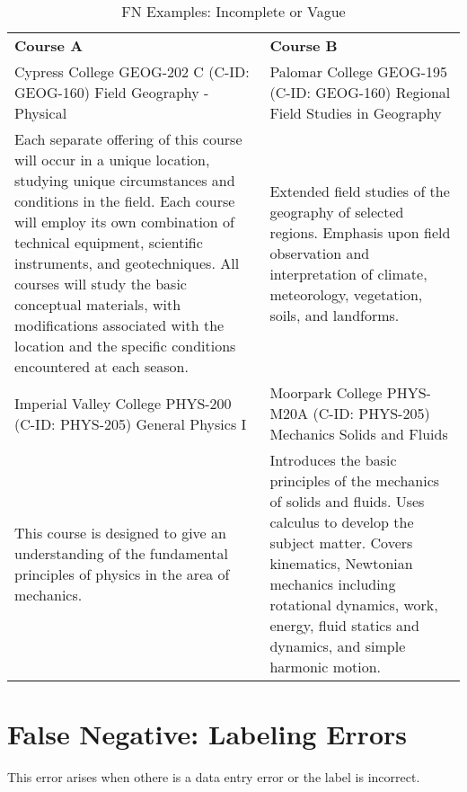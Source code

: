 \begin{longtable}{ >{\baselineskip=12pt}p{}  >{\baselineskip=12pt}p{} }
\captionsetup{skip=5pt}
\caption{FN Examples: Incomplete or Vague}\label{tab:fn_incomplete}\\
\bottomrule\toprule
\textbf{Course A} & \textbf{Course B} \\
\bottomrule\toprule
\endhead
Cypress College \newline GEOG-202 C (C-ID: GEOG-160) \newline Field Geography - Physical & Palomar College \newline GEOG-195 (C-ID: GEOG-160) \newline Regional Field Studies in Geography \\
\midrule
Each separate offering of this course will occur in a unique location, studying unique circumstances and conditions in the field. Each course will employ its own combination of technical equipment, scientific instruments, and geotechniques. All courses will study the basic conceptual materials, with modifications associated with the location and the specific conditions encountered at each season. & Extended field studies of the geography of selected regions. Emphasis upon field observation and interpretation of climate, meteorology, vegetation, soils, and landforms. \\
\bottomrule\toprule
Imperial Valley College \newline PHYS-200 (C-ID: PHYS-205) \newline General Physics I & Moorpark College \newline PHYS-M20A (C-ID: PHYS-205) \newline Mechanics Solids and Fluids \\
\midrule
This course is designed to give an understanding of the fundamental principles of physics in the area of mechanics. & Introduces the basic principles of the mechanics of solids and fluids. Uses calculus to develop the subject matter. Covers kinematics, Newtonian mechanics including rotational dynamics, work, energy, fluid statics and dynamics, and simple harmonic motion. \\
\bottomrule\toprule
\end{longtable}

\section{False Negative: Labeling Errors}\label{app:labelerror}
This error arises when othere is a data entry error or the label is incorrect.

